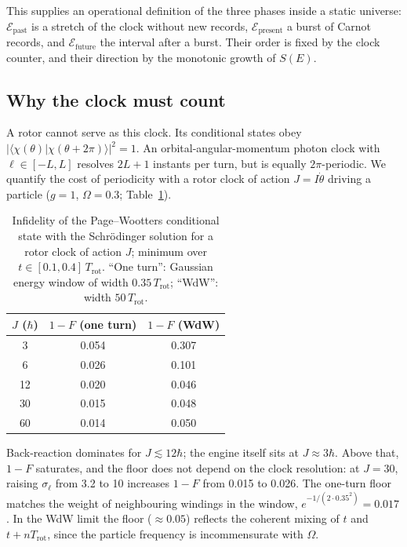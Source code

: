 \documentclass[aps,prc,twocolumn,superscriptaddress,amsmath,amssymb,nofootinbib]{revtex4-2}
\newcommand{\Epast}{\mathcal{E}_{\text{past}}}
\newcommand{\Epres}{\mathcal{E}_{\text{present}}}
\newcommand{\Efut}{\mathcal{E}_{\text{future}}}
\begin{document}
This supplies an operational definition of the three phases inside a static universe: $\Epast$ is a stretch of the clock without new records, $\Epres$ a burst of Carnot records, and $\Efut$ the interval after a burst. Their order is fixed by the clock counter, and their direction by the monotonic growth of $S(E)$.

\subsection{Why the clock must count}
A rotor cannot serve as this clock. Its conditional states obey $|\langle\chi(\theta)|\chi(\theta+2\pi)\rangle|^2=1$. An orbital-angular-momentum photon clock with $\ell\in[-L,L]$ resolves $2L+1$ instants per turn, but is equally $2\pi$-periodic. We quantify the cost of periodicity with a rotor clock of action $J=I\dot\theta$ driving a particle ($g=1$, $\Omega=0.3$; Table~\ref{tab:clock}).

\begin{table}[t]
\caption{Infidelity of the Page--Wootters conditional state with the Schr\"odinger solution for a rotor clock of action $J$; minimum over $t\in[0.1,0.4]\,T_{\text{rot}}$. ``One turn'': Gaussian energy window of width $0.35\,T_{\text{rot}}$; ``WdW'': width $50\,T_{\text{rot}}$.}
\label{tab:clock}
\begin{ruledtabular}
\begin{tabular}{ccc}
$J$ ($\hbar$) & $1-F$ (one turn) & $1-F$ (WdW) \\
\hline
3 & 0.054 & 0.307 \\
6 & 0.026 & 0.101 \\
12 & 0.020 & 0.046 \\
30 & 0.015 & 0.048 \\
60 & 0.014 & 0.050 \\
\end{tabular}
\end{ruledtabular}
\end{table}

Back-reaction dominates for $J\lesssim12\hbar$; the engine itself sits at $J\approx3\hbar$. Above that, $1-F$ saturates, and the floor does not depend on the clock resolution: at $J=30$, raising $\sigma_\ell$ from 3.2 to 10 increases $1-F$ from 0.015 to 0.026. The one-turn floor matches the weight of neighbouring windings in the window, $e^{-1/(2\cdot0.35^2)}=0.017$. In the WdW limit the floor ($\approx0.05$) reflects the coherent mixing of $t$ and $t+nT_{\text{rot}}$, since the particle frequency is incommensurate with $\Omega$.
\end{document}
